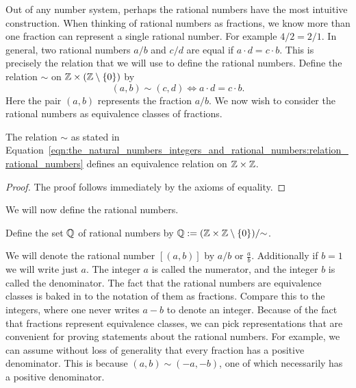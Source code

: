 \documentclass[../main.tex]{subfiles}
\begin{document}
Out of any number system, perhaps the rational numbers have the most intuitive construction. When thinking of rational numbers as fractions, we know more than one fraction can represent a single rational number. For example $4/2=2/1$. In general, two rational numbers $a/b$ and $c/d$ are equal if $a\cdot d=c\cdot b$. This is precisely the relation that we will use to define the rational numbers. Define the relation $\sim$ on $\mathbb{Z}\times(\mathbb{Z}\setminus\{0\})$ by
\begin{equation}\label{eqn:the_natural_numbers_integers_and_rational_numbers:relation_rational_numbers}
    (a,b)\sim(c,d)\iff a\cdot d=c\cdot b.
\end{equation}
Here the pair $(a,b)$ represents the fraction $a/b$. We now wish to consider the rational numbers as equivalence classes of fractions.
\begin{lemma}
    The relation $\sim$ as stated in Equation~\eqref{eqn:the_natural_numbers_integers_and_rational_numbers:relation_rational_numbers} defines an equivalence relation on $\mathbb{Z}\times\mathbb{Z}$.
\end{lemma}
\begin{proof}
    The proof follows immediately by the axioms of equality.
\end{proof}
We will now define the rational numbers.
\begin{definition}
    Define the set $\mathbb{Q}$ of rational numbers by $\mathbb{Q}:=(\mathbb{Z}\times\mathbb{Z}\setminus\{0\})/{\sim}$.
\end{definition}
We will denote the rational number $[(a,b)]$ by $a/b$ or $\frac{a}{b}$. Additionally if $b=1$ we will write just $a$. The integer $a$ is called the numerator, and the integer $b$ is called the denominator. The fact that the rational numbers are equivalence classes is baked in to the notation of them as fractions. Compare this to the integers, where one never writes $a-b$ to denote an integer. Because of the fact that fractions represent equivalence classes, we can pick representations that are convenient for proving statements about the rational numbers. For example, we can assume without loss of generality that every fraction has a positive denominator. This is because $(a,b)\sim(-a,-b)$, one of which necessarily has a positive denominator.
\end{document}
